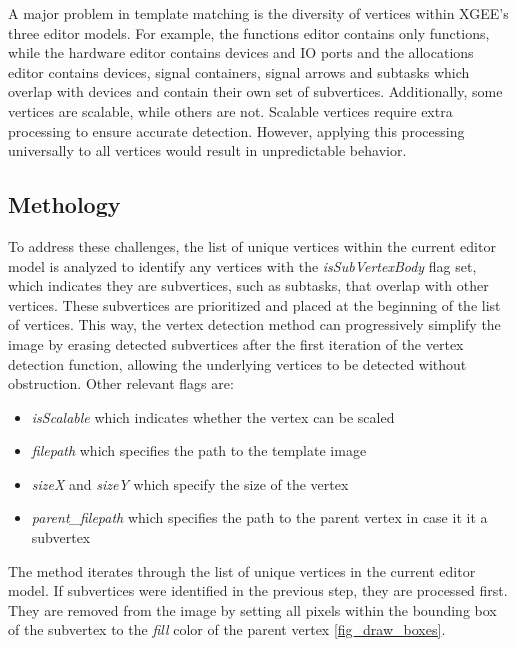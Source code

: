 A major problem in template matching is the diversity of vertices within XGEE's three editor models. For example, the functions editor contains only functions, while the hardware editor contains devices and IO ports and the allocations editor contains devices, signal containers, signal arrows and subtasks which overlap with devices and contain their own set of subvertices. Additionally, some vertices are scalable, while others are not. Scalable vertices require extra processing to ensure accurate detection. However, applying this processing universally to all vertices would result in unpredictable behavior.

\subsection{Methology}
To address these challenges, the list of unique vertices within the current editor model is analyzed to identify any vertices with the \textit{isSubVertexBody} flag set, which indicates they are subvertices, such as subtasks, that overlap with other vertices. These subvertices are prioritized and placed at the beginning of the list of vertices. This way, the vertex detection method can progressively simplify the image by erasing detected subvertices after the first iteration of the vertex detection function, allowing the underlying vertices to be detected without obstruction. Other relevant flags are: 
\begin{itemize}
    \item \textit{isScalable} which indicates whether the vertex can be scaled
    \item \textit{filepath} which specifies the path to the template image
    \item \textit{sizeX} and \textit{sizeY} which specify the size of the vertex
    \item \textit{parent\_filepath} which specifies the path to the parent vertex in case it it a subvertex
\end{itemize}
The method iterates through the list of unique vertices in the current editor model. If subvertices were identified in the previous step, they are processed first. They are removed from the image by setting all pixels within the bounding box of the subvertex to the \textit{fill} color of the parent vertex \ref{fig_draw_boxes}.
